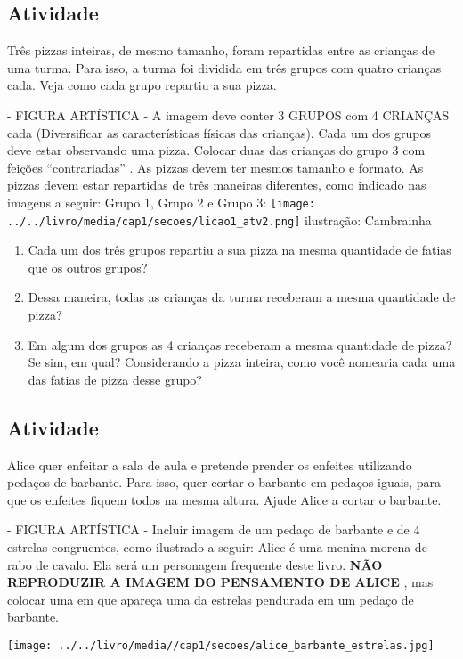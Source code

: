 \documentclass[a4,12pt]{book}
\begin{document}
\subsection{Atividade}
Três pizzas inteiras, de mesmo tamanho, foram repartidas entre as crianças de uma turma. Para isso, a turma foi dividida em três grupos com quatro crianças cada. Veja como cada grupo repartiu a sua pizza.

\begin{imagem*}[breakable]{}{}    - FIGURA ARTÍSTICA - A imagem deve conter 3 GRUPOS com 4 CRIANÇAS cada (Diversificar as características físicas das crianças). Cada um dos grupos deve estar observando uma pizza. Colocar duas das crianças do grupo 3 com feições   ``contrariadas''  . As pizzas devem ter mesmos tamanho e formato. As pizzas devem estar repartidas de três maneiras diferentes, como indicado nas imagens a seguir: Grupo 1, Grupo 2 e Grupo 3:   
    \texttt{[image: ../../livro/media/cap1/secoes/licao1\_atv2.png]}  
  ilustração: Cambrainha  
\end{imagem*}

\begin{enumerate} [\quad a)] %
  \item     Cada um dos três grupos repartiu a sua pizza na mesma quantidade de fatias que os outros grupos?
  \item     Dessa maneira, todas as crianças da turma receberam a mesma quantidade de pizza?
  \item     Em algum dos grupos as 4 crianças receberam a mesma quantidade de pizza? Se sim, em qual? Considerando a pizza inteira, como você nomearia cada uma das fatias de pizza desse grupo? 
\end{enumerate} %

\subsection{Atividade}

Alice quer enfeitar a sala de aula e pretende prender os enfeites utilizando pedaços de barbante. Para isso, quer cortar o barbante em pedaços iguais, para que os enfeites fiquem todos na mesma altura. Ajude Alice a cortar o barbante.

\begin{imagem*}[breakable]{}{}    - FIGURA ARTÍSTICA - Incluir imagem de um pedaço de barbante e de 4 estrelas congruentes, como ilustrado a seguir:  
  Alice é uma menina morena de rabo de cavalo. Ela será um personagem frequente deste livro.  
  {\bf NÃO REPRODUZIR A IMAGEM DO PENSAMENTO DE ALICE}  , mas colocar uma em que apareça uma da estrelas pendurada em um pedaço de barbante.   
  
    \texttt{[image: ../../livro/media//cap1/secoes/alice\_barbante\_estrelas.jpg]}  
\end{imagem*}
\end{document}
